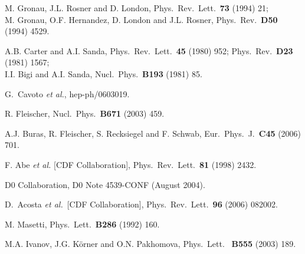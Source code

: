 \documentclass[12pt]{article}
\begin{document}
\begin{thebibliography}{999}
M. Gronau, J.L. Rosner and D. London,
  { Phys.\ Rev.\ Lett.}~{\bf 73} (1994) 21;\\
 M. Gronau, O.F. Hernandez, D. London and J.L. Rosner,
  { Phys.\ Rev.}~{\bf D50} (1994) 4529.
  
A.B. Carter and A.I. Sanda,
{ Phys.\ Rev.\ Lett.}~{\bf 45} (1980) 952;
{ Phys.\ Rev.}~{\bf D23} (1981) 1567;\\
I.I. Bigi and A.I. Sanda,
{ Nucl.\ Phys.}~{\bf B193} (1981) 85.

G.~Cavoto {\it et al.},
  hep-ph/0603019.
  
R. Fleischer,
 {  Nucl.\ Phys.}~{\bf B671} (2003) 459.

A.J. Buras, R. Fleischer, S. Recksiegel and F. Schwab,
  Eur.\ Phys.\ J.\  {\bf C45} (2006) 701.
  
F. Abe {\it et al.}  [CDF Collaboration],
{ Phys.\ Rev.\ Lett.}~{\bf 81} (1998) 2432.

D0 Collaboration, D0 Note 4539-CONF (August 2004).

D.~Acosta {\it et al.}\  [CDF Collaboration],
  Phys.\ Rev.\ Lett.\  {\bf 96} (2006) 082002.

M. Masetti, { Phys.\ Lett.}~{\bf B286} (1992) 160.

M.A. Ivanov, J.G. K\"orner and O.N. Pakhomova,
{ Phys.\ Lett.}~ {\bf B555} (2003) 189.


\end{thebibliography}
\end{document}
